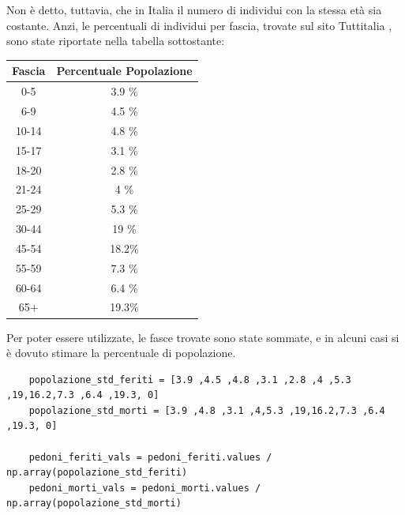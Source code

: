 \documentclass[a4paper]{report}
\begin{document}
Non è detto, tuttavia, che in Italia il numero di individui con la stessa età sia costante.
Anzi, le percentuali di individui per fascia, trovate sul sito Tuttitalia \cite{TUTTITALIA:1}, 
sono state riportate nella tabella sottostante: 

\begin{center}
    \def\arraystretch{1.5}%
    \begin{tabular}{ |c|c| } 
    \hline
    Fascia & Percentuale Popolazione \\ 
    \hline
    \rowcolor{TableGray}
    0-5     & 3.9 \% \\ 
    6-9     & 4.5 \% \\
    \rowcolor{TableGray}
    10-14   & 4.8 \% \\
    15-17   & 3.1 \% \\
    \rowcolor{TableGray}
    18-20   & 2.8 \% \\ 
    21-24   & 4   \% \\
    \rowcolor{TableGray}
    25-29   & 5.3 \% \\
    30-44   & 19  \% \\
    \rowcolor{TableGray}
    45-54   & 18.2\% \\ 
    55-59   & 7.3 \% \\
    \rowcolor{TableGray}
    60-64   & 6.4 \% \\
    65$+$   & 19.3\% \\
    \hline
    \end{tabular}
\end{center}

Per poter essere utilizzate, le fasce trovate sono state sommate, e in alcuni casi si è dovuto 
stimare la percentuale di popolazione.

\begin{lstlisting}
    popolazione_std_feriti = [3.9 ,4.5 ,4.8 ,3.1 ,2.8 ,4 ,5.3 ,19,16.2,7.3 ,6.4 ,19.3, 0]
    popolazione_std_morti = [3.9 ,4.8 ,3.1 ,4,5.3 ,19,16.2,7.3 ,6.4 ,19.3, 0]

    pedoni_feriti_vals = pedoni_feriti.values / np.array(popolazione_std_feriti)
    pedoni_morti_vals = pedoni_morti.values / np.array(popolazione_std_morti)
\end{lstlisting}
\end{document}
